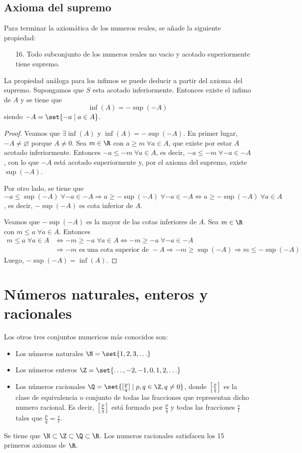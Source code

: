 \subsection{Axioma del supremo}
Para terminar la axiomática de los numeros reales, se añade la siguiente propiedad:
\begin{enumerate}
	\item[16.] Todo subconjunto de los numeros reales no vacio y acotado superiormente tiene supremo.
\end{enumerate}

La propiedad análoga para los infimos se puede deducir a partir del axioma del supremo. Supongamos que \(S \) esta acotado inferiormente. Entonces existe el infimo de \(A \) y se tiene que
\[
	\inf (A) = - \sup (-A )
\]
siendo \(-A = \set{-a \mid a \in A}\).
\begin{proof}
	Veamos que \(\exists \inf (A)\) y \(\inf (A) = - \sup (-A)\). En primer lugar, \(-A \neq \varnothing\) porque \(A \neq 0\). Sea \(m \in \R \) con \(a \geq m \; \forall a \in A\), que existe por estar \(A \) acotado inferiormente. Entonces \(-a \leq -m \; \forall a \in A\), es decir, \(-a \leq -m \; \forall -a \in -A \), con lo que \(-A \) está acotado superiormente y, por el axioma del supremo, existe \(\sup (-A)\).

	Por otro lado, se tiene que \(-a \leq \sup (-A) \; \forall -a \in -A \Rightarrow a \geq -\sup (-A) \; \forall -a \in -A \iff  a \geq - \sup (-A) \; \forall a \in A\), es decir, \(-\sup (-A) \) es cota inferior de \(A \).

	Veamos que \(-\sup (-A)\) es la mayor de las cotas inferiores de \(A \). Sea \(m \in \R\) con \(m \leq a \; \forall a \in A\). Entonces
	\begin{align*}
		m \leq a \; \forall a \in A & \iff  -m \geq -a \; \forall a \in A \iff -m \geq -a \; \forall -a \in -A \\ & \Rightarrow -m \text{ es una cota superior de } -A \Rightarrow -m \geq \sup (-A) \Rightarrow m \leq -\sup (-A)
	\end{align*}
	Luego, \(-\sup (-A) = \inf (A)\).
\end{proof}
\section{Números naturales, enteros y racionales}
Los otros tres conjuntos numericos más conocidos son:
\begin{itemize}
	\item Los números naturales \(\N = \set{1,2,3,\ldots }\)
	\item Los números enteros \(\Z = \set{\ldots,-2,-1,0,1,2,\ldots}\)
	\item Los números racionales \(\Q = \set{[\frac{p}{q}] \mid p,q \in \Z, q \neq 0 }\), donde \([\frac{p}{q }]\) es la clase de equivalencia o conjunto de todas las fracciones que representan dicho numero racional. Es decir, \([\frac{p}{q }]\) está formado por \(\frac{p}{q}\) y todas las fracciones \(\frac{s}{t }\) tales que \(\frac{p}{q } = \frac{s}{t }\).
\end{itemize}
Se tiene que \(\N \subset \Z \subset \Q \subset \R \). Los numeros racionales satisfacen los 15 primeros axiomas de \(\R \).

